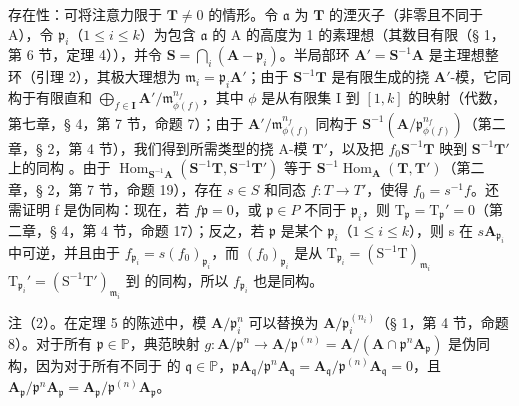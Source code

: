 存在性：可将注意力限于 \(\mathbf{T} \neq 0\) 的情形。令 \(\mathfrak{a}\) 为 \(\mathbf{T}\) 的湮灭子（非零且不同于 A），令 \(\mathfrak{p}_i\)（\(1 \leqslant i \leqslant k\)）为包含 \(\mathfrak{a}\) 的 A 的高度为 1 的素理想（其数目有限（§ 1，第 6 节，定理 4）），并令 \(\mathbf{S} = \bigcap_i (\mathbf{A} - \mathfrak{p}_i)\)。半局部环 \(\mathbf{A}' = \mathbf{S}^{-1}\mathbf{A}\) 是主理想整环（引理 2），其极大理想为 \(\mathfrak{m}_i = \mathfrak{p}_i\mathbf{A}'\)；由于 \(\mathbf{S}^{-1}\mathbf{T}\) 是有限生成的挠 \(\mathbf{A}'\)-模，它同构于有限直和 \(\bigoplus_{f \in \mathbf{I}} \mathbf{A}' / \mathfrak{m}_{\phi(f)}^{n_f}\)，其中 \(\phi\) 是从有限集 I 到 \([1, k]\) 的映射（代数，第七章，§ 4，第 7 节，命题 7）；由于 \(\mathbf{A}' / \mathfrak{m}_{\phi(f)}^{n_f}\) 同构于 \(\mathbf{S}^{-1}(\mathbf{A} / \mathfrak{p}_{\phi(f)}^{n_f})\)（第二章，§ 2，第 4 节），我们得到所需类型的挠 A-模 \(\mathbf{T}'\)，以及把 \(f_0\)\(\mathbf{S}^{-1}\mathbf{T}\) 映到 \(\mathbf{S}^{-1}\mathbf{T}'\) 上的同构 。由于 \(\operatorname{Hom}_{\mathbf{S}^{-1}\mathbf{A}}(\mathbf{S}^{-1}\mathbf{T}, \mathbf{S}^{-1}\mathbf{T}')\) 等于 \(\mathbf{S}^{-1}\operatorname{Hom}_{\mathbf{A}}(\mathbf{T}, \mathbf{T}')\)（第二章，§ 2，第 7 节，命题 19），存在 \(s \in S\) 和同态 \(f: T \to T'\)，使得 \(f_0 = s^{-1}f\)。还需证明 f 是伪同构：现在，若 \(f\)\(\mathfrak{p} = 0\)，或 \(\mathfrak{p} \in P\) 不同于 \(\mathfrak{p}_i\)，则 \(\mathrm{T}_{\mathfrak{p}} = \mathrm{T}_{\mathfrak{p}}' = 0\)（第二章，§ 4，第 4 节，命题 17）；反之，若 \(\mathfrak{p}\) 是某个 \(\mathfrak{p}_i\)（\(1 \leqslant i \leqslant k\)），则 s 在 \(s\)\(\mathbf{A}_{\mathfrak{p}_i}\) 中可逆，并且由于 \(f_{\mathfrak{p}_i} = s(f_0)_{\mathfrak{p}_i}\)，而 \((f_0)_{\mathfrak{p}_i}\) 是从 \(\mathrm{T}_{\mathfrak{p}_i} = (\mathrm{S}^{-1}\mathrm{T})_{\mathfrak{m}_i}\)\(\mathrm{T}_{\mathfrak{p}_i}' = (\mathrm{S}^{-1}\mathrm{T}')_{\mathfrak{m}_i}\) 到  的同构，所以 \(f_{\mathfrak{p}_i}\) 也是同构。

注（2）。在定理 5 的陈述中，模 \(\mathbf{A} / \mathfrak{p}_i^n\) 可以替换为 \(\mathbf{A} / \mathfrak{p}_i^{(n_i)}\)（§ 1，第 4 节，命题 8）。对于所有 \(\mathfrak{p} \in \mathbb{P}\)，典范映射 \(g\colon \mathbf{A} / \mathfrak{p}^n \to \mathbf{A} / \mathfrak{p}^{(n)} = \mathbf{A} / (\mathbf{A} \cap \mathfrak{p}^n \mathbf{A}_{\mathfrak{p}})\) 是伪同构，因为对于所有不同于  的 \(\mathfrak{q} \in \mathbb{P}\)，\(\mathfrak{p}\)\(\mathbf{A}_{\mathfrak{q}} / \mathfrak{p}^n \mathbf{A}_{\mathfrak{q}} = \mathbf{A}_{\mathfrak{q}} / \mathfrak{p}^{(n)} \mathbf{A}_{\mathfrak{q}} = 0\)，且 \(\mathbf{A}_{\mathfrak{p}} / \mathfrak{p}^n \mathbf{A}_{\mathfrak{p}} = \mathbf{A}_{\mathfrak{p}} / \mathfrak{p}^{(n)} \mathbf{A}_{\mathfrak{p}}\)。

